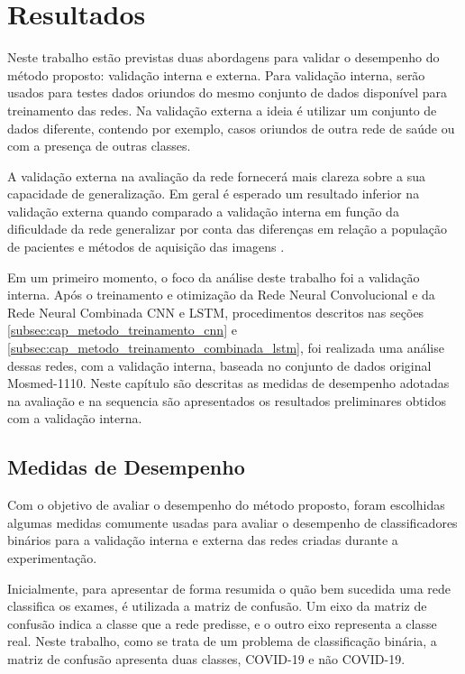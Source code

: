 \chapter{Resultados} \label{cap:cap_resultados}

Neste trabalho estão previstas duas abordagens para validar o desempenho do método proposto: validação interna e externa. Para validação interna, serão usados para testes dados oriundos do mesmo conjunto de dados disponível para treinamento das redes. Na validação externa a ideia é utilizar um conjunto de dados diferente, contendo por exemplo, casos oriundos de outra rede de saúde ou com a presença de outras classes. 

A validação externa na avaliação da rede fornecerá mais clareza sobre a sua capacidade de generalização. Em geral é esperado um resultado inferior na validação externa quando comparado a validação interna em função da dificuldade da rede generalizar por conta das diferenças em relação a população de pacientes e métodos de aquisição das imagens \cite{zech2018variable}.

Em um primeiro momento, o foco da análise deste trabalho foi a validação interna. Após o treinamento e otimização da Rede Neural Convolucional e da Rede Neural Combinada CNN e LSTM, procedimentos descritos nas seções \ref{subsec:cap_metodo_treinamento_cnn} e \ref{subsec:cap_metodo_treinamento_combinada_lstm}, foi realizada uma análise dessas redes, com a validação interna, baseada no conjunto de dados original Mosmed-1110. Neste capítulo são descritas as medidas de desempenho adotadas na avaliação e na sequencia são apresentados os resultados preliminares obtidos com a validação interna.

\section{Medidas de Desempenho}\label{sec:cap_resultados_métricas}

Com o objetivo de avaliar o desempenho do método proposto, foram escolhidas algumas medidas comumente usadas para avaliar o desempenho de classificadores binários para a validação interna e externa das redes criadas durante a experimentação. 

Inicialmente, para apresentar de forma resumida o quão bem sucedida uma rede classifica os exames, é utilizada a matriz de confusão. Um eixo da matriz de confusão indica a classe que a rede predisse, e o outro eixo representa a classe real. Neste trabalho, como se trata de um problema de classificação binária, a matriz de confusão apresenta duas classes, COVID-19 e não COVID-19. 

